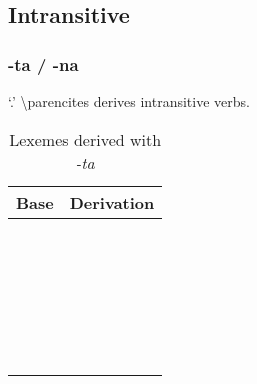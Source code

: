 \documentclass{memoir}
\begin{document}
\subsection{Intransitive}

\subsubsection{-ta / -na}

 `.' \textbackslash parencites derives
intransitive verbs.

\begin{table}
\caption{Lexemes derived with \emph{-ta}}
\label{tab:tavbz}
\centering
\begin{tabular}{ll}
\toprule
Base & Derivation \\
\midrule
     &            \\
     &            \\
     &            \\
     &            \\
     &            \\
     &            \\
     &            \\
     &            \\
     &            \\
     &            \\
     &            \\
     &            \\
     &            \\
     &            \\
     &            \\
     &            \\
     &            \\
     &            \\
     &            \\
     &            \\
     &            \\
     &            \\
     &            \\
     &            \\
     &            \\
     &            \\
\bottomrule
\end{tabular}

\end{table}
\end{document}
